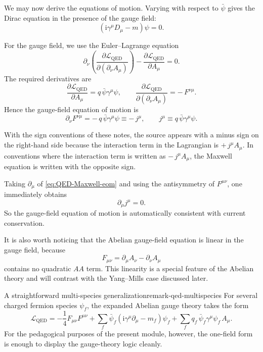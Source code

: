 \documentclass[11pt,a4paper]{article}
\newcommand{\Lag}{\mathcal{L}}
\newcommand{\ii}{\mathrm{i}}
\newcommand{\p}{\partial}
\newcommand{\gmu}{\gamma^\mu}
\begin{document}
We may now derive the equations of motion. Varying with respect to \(\bar\psi\) gives the Dirac equation in the presence of the gauge field:
\begin{equation}
	(\ii\gmu D_\mu-m)\psi=0.
	\label{eq:QED-Dirac-eom}
\end{equation}

For the gauge field, we use the Euler--Lagrange equation
\[
\p_\nu\!\left(\frac{\partial \Lag_{\text{QED}}}{\partial(\p_\nu A_\mu)}\right)
-
\frac{\partial \Lag_{\text{QED}}}{\partial A_\mu}
=0.
\]
The required derivatives are
\begin{equation}
	\frac{\partial \Lag_{\text{QED}}}{\partial A_\mu}
	=
	q\,\bar\psi\gmu\psi,
	\qquad
	\frac{\partial \Lag_{\text{QED}}}{\partial(\p_\nu A_\mu)}
	=
	-\,F^{\nu\mu}.
	\label{eq:QED-EL-ingredients}
\end{equation}
Hence the gauge-field equation of motion is
\begin{equation}
	\p_\nu F^{\nu\mu}
	=
	-\,q\,\bar\psi\gmu\psi
	\equiv
	-\,j^\mu,
	\qquad
	j^\mu\equiv q\,\bar\psi\gmu\psi.
	\label{eq:QED-Maxwell-eom}
\end{equation}

With the sign conventions of these notes, the source appears with a minus sign on the right-hand side because the interaction term in the Lagrangian is \(+\,j^\mu A_\mu\). In conventions where the interaction term is written as \(-\,j^\mu A_\mu\), the Maxwell equation is written with the opposite sign.

Taking \(\p_\mu\) of \eqref{eq:QED-Maxwell-eom} and using the antisymmetry of \(F^{\mu\nu}\), one immediately obtains
\begin{equation}
	\p_\mu j^\mu=0.
	\label{eq:QED-current-conservation-from-EOM}
\end{equation}
So the gauge-field equation of motion is automatically consistent with current conservation.

It is also worth noticing that the Abelian gauge-field equation is linear in the gauge field, because
\[
F_{\mu\nu}=\p_\mu A_\nu-\p_\nu A_\mu
\]
contains no quadratic \(AA\) term. This linearity is a special feature of the Abelian theory and will contrast with the Yang--Mills case discussed later.




\begin{remarkbox}{A straightforward multi-species generalization}{remark-qed-multispecies}
For several charged fermion species \(\psi_f\), the expanded Abelian gauge theory takes the form
	\[
	\Lag_{\text{QED}}
	=
	-\frac14 F_{\mu\nu}F^{\mu\nu}
	+
	\sum_f \bar\psi_f(\ii\gmu\p_\mu-m_f)\psi_f
	+
	\sum_f q_f\,\bar\psi_f\gmu\psi_f\,A_\mu.
	\]
For the pedagogical purposes of the present module, however, the one-field form is enough to display the gauge-theory logic cleanly.
\end{remarkbox}
\end{document}
